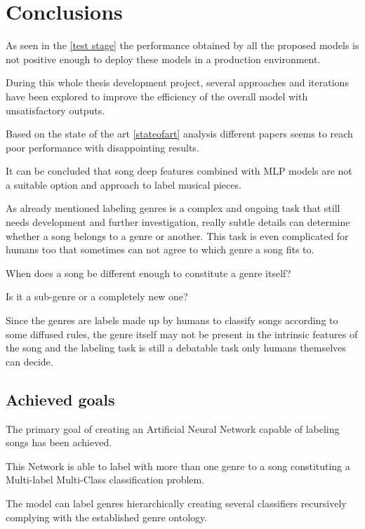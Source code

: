 
\chapter{Conclusions}

\label{conclusions}
As seen in the \ref{test stage} the performance obtained by all the proposed models is not positive enough to deploy these models in a production environment.

During this whole thesis development project, several approaches and iterations have been explored to improve the efficiency of the overall model with unsatisfactory outputs.

Based on the state of the art \ref{stateofart} analysis different papers seems to reach poor performance with disappointing results.

It can be concluded that song deep features combined with MLP models are not a suitable option and approach to label musical pieces. 

As already mentioned labeling genres is a complex and ongoing task that still needs development and further investigation, really subtle details can determine whether a song belongs to a genre or another. This task is even complicated for humans too that sometimes can not agree to which genre a song fits to. 

When does a song be different enough to constitute a genre itself?

Is it a sub-genre or a completely new one?

Since the genres are labels made up by humans to classify songs according to some diffused rules, the genre itself may not be present in the intrinsic features of the song and the labeling task is still a debatable task only humans themselves can decide.

\section{Achieved goals}
The primary goal of creating an Artificial Neural Network capable of labeling songs has been achieved.

This Network is able to label with more than one genre to a song constituting a Multi-label Multi-Class classification problem.

The model can label genres hierarchically creating several classifiers recursively complying with the established genre ontology.

